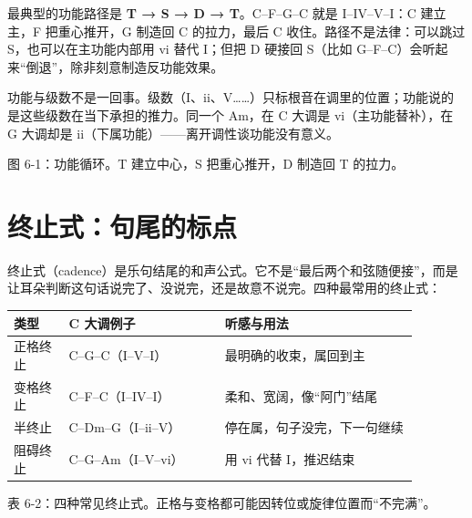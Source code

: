 最典型的功能路径是 \textbf{T → S → D → T}。C–F–G–C 就是 I–IV–V–I：C 建立主，F 把重心推开，G 制造回 C 的拉力，最后 C 收住。路径不是法律：可以跳过 S，也可以在主功能内部用 vi 替代 I；但把 D 硬接回 S（比如 G–F–C）会听起来“倒退”，除非刻意制造反功能效果。

功能与级数不是一回事。级数（I、ii、V……）只标根音在调里的位置；功能说的是这些级数在当下承担的推力。同一个 Am，在 C 大调是 vi（主功能替补），在 G 大调却是 ii（下属功能）——离开调性谈功能没有意义。

\begin{center}
\begin{minipage}{0.82\linewidth}
\centering
{}

图 6-1：功能循环。T 建立中心，S 把重心推开，D 制造回 T 的拉力。
\end{minipage}
\end{center}

\section{终止式：句尾的标点}

终止式（cadence）是乐句结尾的和声公式。它不是“最后两个和弦随便接”，而是让耳朵判断这句话说完了、没说完，还是故意不说完。四种最常用的终止式：

\begin{center}
\small
\begin{tabular}{p{0.12\linewidth}p{0.34\linewidth}p{0.42\linewidth}}
\toprule
类型 & C 大调例子 & 听感与用法 \\
\midrule
正格终止 & C–G–C（I–V–I） & 最明确的收束，属回到主 \\
变格终止 & C–F–C（I–IV–I） & 柔和、宽阔，像“阿门”结尾 \\
半终止 & C–Dm–G（I–ii–V） & 停在属，句子没完，下一句继续 \\
阻碍终止 & C–G–Am（I–V–vi） & 用 vi 代替 I，推迟结束 \\
\bottomrule
\end{tabular}

表 6-2：四种常见终止式。正格与变格都可能因转位或旋律位置而“不完满”。
\end{center}

